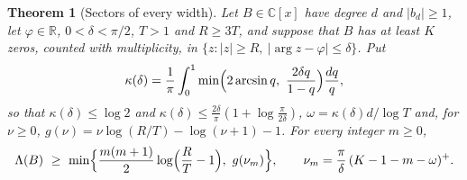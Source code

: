 \documentclass[11pt]{article}
\newtheorem{theorem}{Theorem}[section]
\newcommand{\R}{\mathbb R}
\begin{document}
\begin{theorem}[Sectors of every width]\label{thm:widesector}
Let $B\in\mathbb C[x]$ have degree $d$ and $|b_d|\ge1$, let $\varphi\in\R$,
$0<\delta<\pi/2$, $T>1$ and $R\ge3T$, and suppose that $B$ has at least $K$
zeros, counted with multiplicity, in
$\{z:|z|\ge R,\ |\arg z-\varphi|\le\delta\}$.  Put
\[
  \kappa(\delta)=\frac1\pi\int_0^1\min\Bigl(2\arcsin q,\ \frac{2\delta q}{1-q}\Bigr)\frac{dq}q,
\]
so that $\kappa(\delta)\le\log2$ and
$\kappa(\delta)\le\frac{2\delta}\pi(1+\log\frac\pi{2\delta})$,
$\omega=\kappa(\delta)d/\log T$ and, for $\nu\ge0$,
$g(\nu)=\nu\log(R/T)-\log(\nu+1)-1$.  For every integer $m\ge0$,
\[
  \Lambda(B)\ \ge\ \min\Bigl\{\frac{m(m+1)}2\log\Bigl(\frac RT-1\Bigr),\
  g(\nu_m)\Bigr\},\qquad
  \nu_m=\frac\pi\delta\,(K-1-m-\omega)^+ .
\]
\end{theorem}
\end{document}
